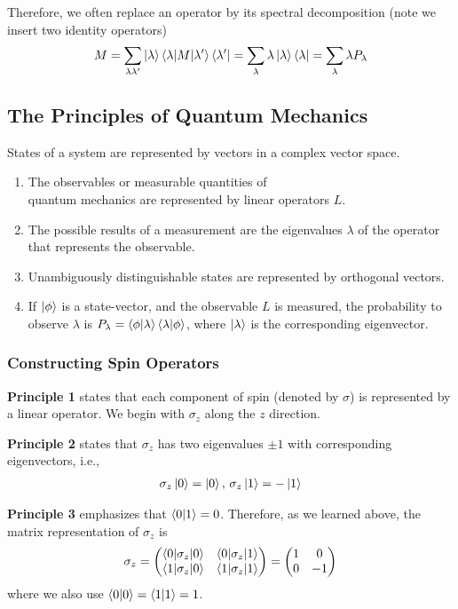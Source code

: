 Therefore, we often replace an operator by its spectral decomposition (note we insert two identity operators)
\begin{align*}
    M=\sum_{\lambda \lambda'}\ket{\lambda}\braket{\lambda|M|\lambda'}\bra{\lambda'}=\sum_{\lambda}\lambda\ket{\lambda}\bra{\lambda}=\sum_{\lambda}\lambda P_{\lambda}
\end{align*}

\subsection{The \textbf{Principles }of Quantum Mechanics}
States of a system are represented by vectors in a complex vector space.
\begin{enumerate}
    \item The observables or measurable quantities of \\quantum mechanics are represented by linear operators $L$.
    \item The possible results of a measurement are the eigenvalues $\lambda$ of the operator that represents the observable.
    \item Unambiguously distinguishable states are represented by orthogonal vectors.
    \item If $\ket{\phi}$ is a state-vector, and the observable $L$ is measured, the probability to observe $\lambda$ is $P_{\lambda} = \braket{\phi | \lambda}\braket{\lambda|\phi}$, where $\ket{\lambda}$ is the corresponding eigenvector.
\end{enumerate}

\subsubsection{Constructing Spin Operators}
\textbf{Principle 1} states that each component of spin (denoted by $\sigma$) is represented by a linear operator. We begin with $\sigma_z$ along the $z$ direction.

\textbf{Principle 2} states that $\sigma_z$ has two eigenvalues $\pm 1$ with
corresponding eigenvectors, i.e.,
\begin{align*}
    \sigma_z\ket{0}=\ket{0},\, \sigma_z\ket{1}=-\ket{1}
\end{align*}

\textbf{Principle 3} emphasizes that $\braket{0|1} = 0$. Therefore, as we learned above, the matrix representation of $\sigma_z$ is
\begin{align*}
    \sigma_z=\begin{pmatrix}
        \braket{0|\sigma_z|0} & \braket{0|\sigma_z|1}\\
        \braket{1|\sigma_z|0} & \braket{1|\sigma_z|1}
    \end{pmatrix}=\begin{pmatrix}
        1 & 0\\ 0 & -1
    \end{pmatrix}
\end{align*}
where we also use $\braket{0|0} =\braket{1|1} = 1$.

